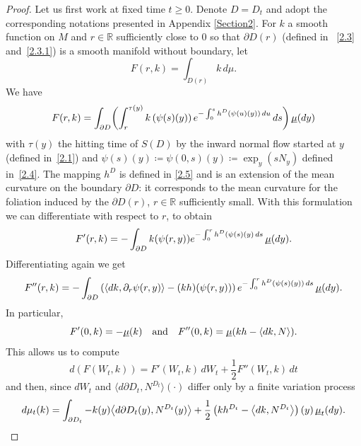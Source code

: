 \documentclass[JEP,XML,SOM,Unicode,NoFloatCountersInSection,published]{cedram}
\theoremstyle{plain}
\theoremstyle{definition}
\newcommand{\RR}{{\mathbb R}}
\newcommand\df{\coloneqq}
\newcommand{\usm}{{\underline{\smash{\mu}}}}
\let\f\frac
\let\pa\partial
\begin{document}
\begin{proof}
Let us first work at fixed time $t\geq 0$. Denote $D=D_t$ and adopt the corresponding notations presented in Appendix \ref{Section2}.
For $k$ a smooth function on $M$ and $r\in \RR$ sufficiently close to $0$ so that $\partial D(r)$ (defined in ~\eqref{2.3} and~\eqref{2.3.1}) is a smooth manifold without boundary, let
\begin{equation}
F(r,k)=\int_{D(r)}k\,d\mu.
\end{equation}
We have
\begin{equation}%
F(r,k)=\int_{\partial D}\biggl(\int_r^{\tau(y)}k\left(\psi(s)(y)\right)e^{-\int_0^sh^{{D}}(\psi(u)(y))\,du}{\, ds}\biggr)\,\usm(dy)
\end{equation}
with $\tau(y)$ the hitting time of $S(D)$ by the inward normal flow started at $y$ (defined in~\eqref{2.1}) and $\psi(s)(y)\df\psi(0,s)(y)\df\exp_y(sN_y)$ defined in~\eqref{2.4}.
The mapping $h^D$ is defined in \eqref{2.5} and is an extension of the mean curvature on the boundary $\pa D$: it corresponds to the mean curvature for the foliation induced by the $\pa D(r)$, $r\in\RR$ sufficiently small.
With this formulation we can differentiate with respect to $r$, to obtain
\begin{equation}
F'(r,k)=-\int_{\partial D} k(\psi(r,y))e^{-\int_0^rh^{{D}}(\psi(s)(y)\,ds}\,\usm(dy).
\end{equation}
Differentiating again we get
\begin{equation}
F''(r,k)=-\int_{\partial D}\left( \langle dk,\partial_r\psi(r,y)\rangle - (kh)(\psi(r,y))\right)e^{-\int_0^rh^{{D}}(\psi(s)(y))\,ds}\,\usm(dy).
\end{equation}
In particular,
\begin{equation}
F'(0,k)=-\usm(k)\quad\hbox{and}\quad F''(0,k)=\usm(kh-\langle dk,N\rangle).
\end{equation}
This allows us to compute
\begin{equation}
d(F(W_t,k))=F'(W_t,k)\,dW_t+\f12 F''(W_t,k)\, dt
\end{equation}
and then, since $dW_t$ and $\langle d\partial D_t, N^{D_t}\rangle(\cdot)$ differ only by a finite variation process
\begin{equation}
d\mu_t(k)=\int_{\partial D_t}-{k}(y)\bigl\langle d\partial D_t(y),N^{D_t}(y)\bigr\rangle +\f12 \left(kh^{{D_t}}-\bigl\langle dk,N^{D_t}\bigr\rangle\right)(y)\,\usm_{{t}}(dy).
\end{equation}

\end{proof}
\end{document}
